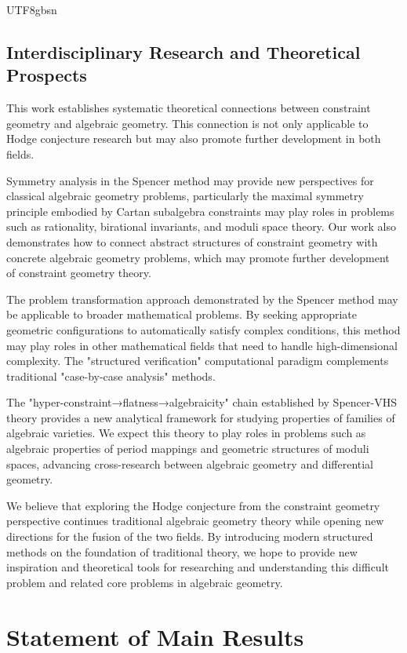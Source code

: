 \documentclass[a4paper,12pt]{extarticle}
\theoremstyle{definition}
\begin{document}
\begin{CJK}{UTF8}{gbsn}
\subsection{Interdisciplinary Research and Theoretical Prospects}
\label{subsec:interdisciplinary_dialogue_future}

This work establishes systematic theoretical connections between constraint geometry and algebraic geometry. This connection is not only applicable to Hodge conjecture research but may also promote further development in both fields.

Symmetry analysis in the Spencer method may provide new perspectives for classical algebraic geometry problems, particularly the maximal symmetry principle embodied by Cartan subalgebra constraints may play roles in problems such as rationality, birational invariants, and moduli space theory. Our work also demonstrates how to connect abstract structures of constraint geometry with concrete algebraic geometry problems, which may promote further development of constraint geometry theory.

The problem transformation approach demonstrated by the Spencer method may be applicable to broader mathematical problems. By seeking appropriate geometric configurations to automatically satisfy complex conditions, this method may play roles in other mathematical fields that need to handle high-dimensional complexity. The "structured verification" computational paradigm complements traditional "case-by-case analysis" methods.

The "hyper-constraint→flatness→algebraicity" chain established by Spencer-VHS theory provides a new analytical framework for studying properties of families of algebraic varieties. We expect this theory to play roles in problems such as algebraic properties of period mappings and geometric structures of moduli spaces, advancing cross-research between algebraic geometry and differential geometry.

We believe that exploring the Hodge conjecture from the constraint geometry perspective continues traditional algebraic geometry theory while opening new directions for the fusion of the two fields. By introducing modern structured methods on the foundation of traditional theory, we hope to provide new inspiration and theoretical tools for researching and understanding this difficult problem and related core problems in algebraic geometry.

\section{Statement of Main Results}
\label{sec:main_results}


\end{CJK}
\end{document}
